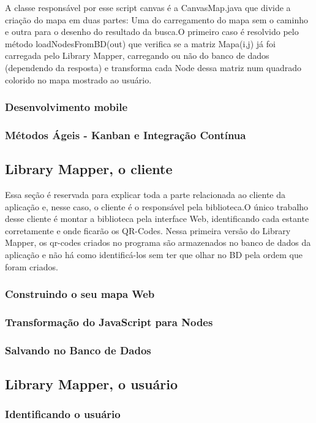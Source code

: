 \documentclass[a4paper,10pt]{article}
\begin{document}
	A classe responsável por esse script canvas é a CanvasMap.java que divide a criação do mapa em duas partes: Uma do carregamento do mapa
	 sem o caminho e outra para o desenho do resultado da busca.O primeiro caso é resolvido pelo método loadNodesFromBD(out) que verifica se
	a matriz Mapa(i,j) já foi carregada pelo Library Mapper, carregando ou não do banco de dados (dependendo da resposta) e transforma cada Node
	dessa matriz num quadrado colorido no mapa mostrado ao usuário.


      	\subsubsection{Desenvolvimento mobile}
	\subsubsection{Métodos Ágeis - Kanban e Integração Contínua}
	
   \subsection{Library Mapper, o cliente}
	Essa seção é reservada para explicar toda a parte relacionada ao cliente da aplicação e, nesse caso, o cliente é o responsável pela biblioteca.O único trabalho desse cliente é montar a biblioteca pela interface Web, identificando cada estante corretamente e onde ficarão os QR-Codes.
	Nessa primeira versão do Library Mapper, os qr-codes criados no programa são armazenados no banco de dados da aplicação e não há como identificá-los sem ter que olhar no BD pela ordem que foram criados.
	\subsubsection{Construindo o seu mapa Web}
	
	\subsubsection{Transformação do JavaScript para Nodes}
	\subsubsection{Salvando no Banco de Dados}
   \subsection{Library Mapper, o usuário}
	\subsubsection{Identificando o usuário}
\end{document}
